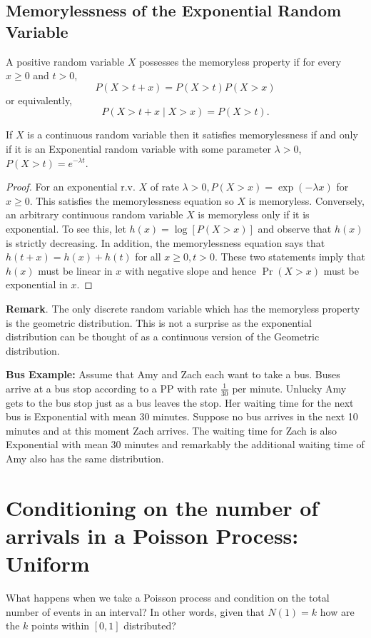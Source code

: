 \documentclass[11pt]{elegantbook}
\begin{document}
\subsection{Memorylessness of the Exponential Random Variable}
\begin{definition}[Memorylessness]
    A positive random variable $X$ possesses the memoryless property if for every $x \geq 0$ and $t>0$,
    $$
    P(X>t+x)=P(X>t) P(X>x)
    $$
    or equivalently,
    $$
    P(X>t+x \mid X>x)=P(X>t) .
    $$
\end{definition}
\begin{lemma}
    If $X$ is a continuous random variable then it satisfies memorylessness if and only if it is an Exponential random variable with some parameter $\lambda>0$, $P(X>t)=e^{-\lambda t}$.
\end{lemma}
\begin{proof}
    For an exponential r.v. $X$ of rate $\lambda>0, P(X>x)=\exp (-\lambda x)$ for $x \geq 0$. This satisfies the memorylessness equation so $X$ is memoryless. Conversely, an arbitrary continuous random variable $X$ is memoryless only if it is exponential. To see this, let $h(x)=\log [P(X>x)]$ and observe that $h(x)$ is strictly decreasing. In addition, the memorylessness equation says that $h(t+x)=h(x)+h(t)$ for all $x \geq 0, t>0$. These two statements imply that $h(x)$ must be linear in $x$ with negative slope and hence $\operatorname{Pr}(X>x)$ must be exponential in $x$.
\end{proof}

\textbf{Remark}. The only discrete random variable which has the memoryless property is the geometric distribution. This is not a surprise as the exponential distribution can be thought of as a continuous version of the Geometric distribution.

\textbf{Bus Example:} Assume that Amy and Zach each want to take a bus. Buses arrive at a bus stop according to a PP with rate $\frac{1}{30}$ per minute. Unlucky Amy gets to the bus stop just as a bus leaves the stop. Her waiting time for the next bus is Exponential with mean 30 minutes. Suppose no bus arrives in the next 10 minutes and at this moment Zach arrives. The waiting time for Zach is also Exponential with mean 30 minutes and remarkably the additional waiting time of Amy also has the same distribution.

\section{Conditioning on the number of arrivals in a Poisson Process: Uniform}
What happens when we take a Poisson process and condition on the total number of events in an interval? In other words, given that $N(1)=k$ how are the $k$ points within $[0,1]$ distributed?
\end{document}
